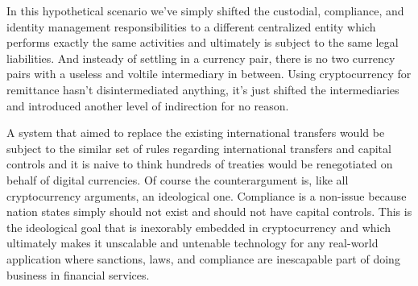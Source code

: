
In this hypothetical scenario we've simply shifted the custodial, compliance, and
identity management responsibilities to a different centralized entity which
performs exactly the same activities and ultimately is subject to the same legal
liabilities. And insteady of settling in a currency pair, there is no two
currency pairs with a useless and voltile intermediary in between. Using
cryptocurrency for remittance hasn't disintermediated anything, it's just
shifted the intermediaries and introduced another level of indirection for no
reason.

A system that aimed to replace the existing international transfers would be
subject to the similar set of rules regarding international transfers and
capital controls and it is naive to think hundreds of treaties would be
renegotiated on behalf of digital currencies. Of course the counterargument is,
like all cryptocurrency arguments, an ideological one. Compliance is a non-issue
because nation states simply should not exist and should not have capital
controls. This is the ideological goal that is inexorably embedded in
cryptocurrency and which ultimately makes it unscalable and untenable technology
for any real-world application where sanctions, laws, and compliance are
inescapable part of doing business in financial services.

